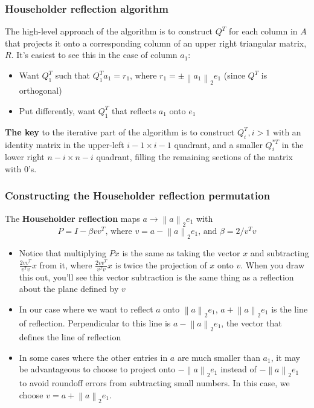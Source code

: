 \documentclass{article}
\newcommand{\norm}[2]{\left\lVert#1\right\rVert_#2}
\begin{document}
\subsubsection{Householder reflection algorithm}
The high-level approach of the algorithm is to construct $Q^T$ for each column in $A$ that projects it onto a corresponding column of an upper right triangular matrix, $R$. It's easiest to see this in the case of column $a_1$:\
\begin{itemize}
    \item Want $Q_1^T$ such that $Q_1^Ta_1 = r_1$, where $r_1 = \pm \norm{a_1}{2}e_1$ (since $Q^T$ is orthogonal)
    \item Put differently, want $Q_1^T$ that reflects $a_1$ onto $e_1$
\end{itemize}
\textbf{The key} to the iterative part of the algorithm is to construct $Q_i^T, i > 1$ with an identity matrix in the upper-left $i-1 \times i-1$ quadrant, and a smaller $Q_i^{*T}$ in the lower right $n-i \times n-i$ quadrant, filling the remaining sections of the matrix with $0$'s.

\subsubsection{Constructing the Householder reflection permutation}
\noindent The \textbf{Householder reflection} maps $a \rightarrow \norm{a}{2}e_1$ with
\begin{equation*}
    P = I - \beta vv^T \textrm{, where $v = a - \norm{a}{2}e_1$, and $\beta = 2/v^Tv$}
\end{equation*}
\begin{itemize}
    \item Notice that multiplying $Px$ is the same as taking the vector $x$ and subtracting $\frac{2vv^T}{v^Tv}x$ from it, where $\frac{2vv^T}{v^Tv}x$ is twice the projection of $x$ onto $v$. When you draw this out, you'll see this vector subtraction is the same thing as a reflection about the plane defined by $v$
    \item In our case where we want to reflect $a$ onto $\norm{a}{2}e_1$,  $a + \norm{a}{2}e_1$ is the line of reflection. Perpendicular to this line is $a - \norm{a}{2}e_1$, the vector that defines the line of reflection
    \item In some cases where the other entries in $a$ are much smaller than $a_1$, it may be advantageous to choose to project onto $-\norm{a}{2}e_1$ instead of $-\norm{a}{2}e_1$ to avoid roundoff errors from subtracting small numbers. In this case, we choose $v = a + \norm{a}{2}e_1$.
\end{itemize}
\end{document}
